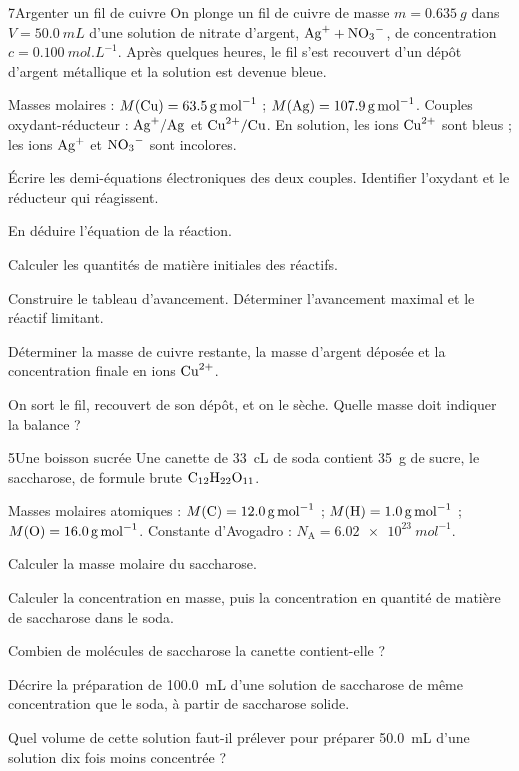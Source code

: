 \begin{exoBac}{7}{Argenter un fil de cuivre}
On plonge un fil de cuivre de masse $m=\qty{0,635}{g}$ dans $V=\qty{50,0}{mL}$ d'une solution de nitrate d'argent, $\ce{Ag+}+\ce{NO3-}$, de
concentration $c=\qty{0,100}{mol.L^{-1}}$. Après quelques heures, le fil s'est recouvert d'un dépôt d'argent métallique et la solution
est devenue bleue.
\begin{donnees}
Masses molaires : $M(\ce{Cu})=\qty{63,5}{g.mol^{-1}}$ ; $M(\ce{Ag})=\qty{107,9}{g.mol^{-1}}$. Couples oxydant-réducteur : $\ce{Ag+}/\ce{Ag}$ et
$\ce{Cu^{2+}}/\ce{Cu}$. En solution, les ions $\ce{Cu^{2+}}$ sont bleus ; les ions $\ce{Ag+}$ et $\ce{NO3-}$ sont incolores.
\end{donnees}
\begin{questions}
\item Écrire les demi-équations électroniques des deux couples. Identifier l'oxydant et le réducteur qui réagissent.
\item En déduire l'équation de la réaction.
\item Calculer les quantités de matière initiales des réactifs.
\item Construire le tableau d'avancement. Déterminer l'avancement maximal et le réactif limitant.
\item Déterminer la masse de cuivre restante, la masse d'argent déposée et la concentration finale en ions $\ce{Cu^{2+}}$.
\item On sort le fil, recouvert de son dépôt, et on le sèche. Quelle masse doit indiquer la balance ?
\end{questions}
\end{exoBac}

\begin{exoBac}{5}{Une boisson sucrée}
Une canette de \qty{33}{cL} de soda contient \qty{35}{g} de sucre, le saccharose, de formule brute $\ce{C12H22O11}$.
\begin{donnees}
Masses molaires atomiques : $M(\ce{C})=\qty{12,0}{g.mol^{-1}}$ ; $M(\ce{H})=\qty{1,0}{g.mol^{-1}}$ ; $M(\ce{O})=\qty{16,0}{g.mol^{-1}}$. Constante
d'Avogadro : $N_\mathrm{A}=\qty{6,02e23}{mol^{-1}}$.
\end{donnees}
\begin{questions}
\item Calculer la masse molaire du saccharose.
\item Calculer la concentration en masse, puis la concentration en quantité de matière de saccharose dans le soda.
\item Combien de molécules de saccharose la canette contient-elle ?
\item Décrire la préparation de \qty{100,0}{mL} d'une solution de saccharose de même concentration que le soda, à partir de
saccharose solide.
\item Quel volume de cette solution faut-il prélever pour préparer \qty{50,0}{mL} d'une solution dix fois moins concentrée ?
\end{questions}
\end{exoBac}
